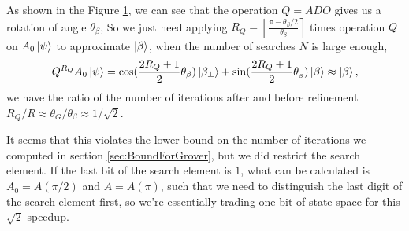 \documentclass[a4paper,10pt]{book}
\numberwithin{equation}{section}
\begin{document}
\begin{figure}[h]
    \centering
    \caption{}
    \label{fig:Abdulrahman}
\end{figure}

As shown in the Figure \ref{fig:Abdulrahman}, we can see that the operation $Q=ADO$ gives us a rotation of angle $\theta_{\beta}$, So we just need applying $R_{Q}=\left\lfloor\frac{\pi-\theta_{\beta}/2}{\theta_{\beta}}\right\rceil$ times operation $Q$ on $A_{0}\ket{\psi}$ to approximate $\ket{\beta}$, when the number of searches $N$ is large enough,
\begin{equation}
    Q^{R_{Q}}A_{0}\ket{\psi}=\cos(\frac{2R_{Q}+1}{2}\theta_{\beta})\ket{\beta_{\perp}}+\sin(\frac{2R_{Q}+1}{2}\theta_{_{\beta}})\ket{\beta}\approx\ket{\beta},
\end{equation}
we have the ratio of the number of iterations after and before refinement $R_{Q}/R\approx\theta_{G}/\theta_{\beta}\approx 1/\sqrt{2}$.

It seems that this violates the lower bound on the number of iterations we computed in section \ref{sec:BoundForGrover}, but we did restrict the search element. If the last bit of the search element is $1$, what can be calculated is $A_{0}=A(\pi/2)$ and $A=A(\pi)$, such that we need to distinguish the last digit of the search element first, so we're essentially trading one bit of state space for this $\sqrt{2}$ speedup.





\end{document}
